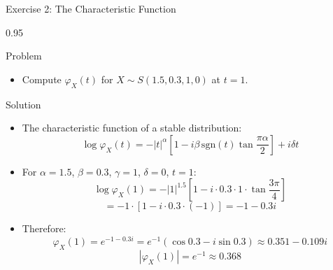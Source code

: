 \documentclass[9pt, aspectratio=169, t]{beamer}
\begin{document}
\begin{frame}{Exercise 2: The Characteristic Function}
    \begin{cminipage}{0.95\textwidth}
\begin{block}{Problem}
\begin{itemize}\setlength{\itemsep}{0pt}
    \item Compute $\varphi_X(t)$ for $X \sim S(1.5, 0.3, 1, 0)$ at $t = 1$.
\end{itemize}
\end{block}

\begin{exampleblock}{Solution}
\begin{itemize}\setlength{\itemsep}{0pt}
    \item The characteristic function of a stable distribution:
$$\log \varphi_X(t) = -|t|^\alpha \left[1 - i\beta\,\text{sgn}(t)\tan\frac{\pi\alpha}{2}\right] + i\delta t$$
    \item For $\alpha = 1.5$, $\beta = 0.3$, $\gamma = 1$, $\delta = 0$, $t = 1$:
$$\log \varphi_X(1) = -|1|^{1.5}\left[1 - i \cdot 0.3 \cdot 1 \cdot \tan\frac{3\pi}{4}\right]$$
$$= -1 \cdot [1 - i \cdot 0.3 \cdot (-1)] = -1 - 0.3i$$
    \item Therefore:
$$\varphi_X(1) = e^{-1 - 0.3i} = e^{-1}(\cos 0.3 - i\sin 0.3) \approx 0.351 - 0.109i$$
$$|\varphi_X(1)| = e^{-1} \approx 0.368$$
\end{itemize}
\end{exampleblock}
    \end{cminipage}
\end{frame}
\end{document}
